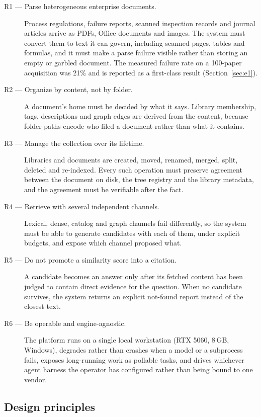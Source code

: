 \begin{description}
\item[R1 --- Parse heterogeneous enterprise documents.] Process regulations,
failure reports, scanned inspection records and journal articles arrive as
PDFs, Office documents and images. The system must convert them to text it
can govern, including scanned pages, tables and formulas, and it must make a
parse failure visible rather than storing an empty or garbled document. The
measured failure rate on a 100-paper acquisition was 21\% and is reported as
a first-class result (Section~\ref{sec:e1}).
\item[R2 --- Organize by content, not by folder.] A document's home must be
decided by what it says. Library membership, tags, descriptions and graph
edges are derived from the content, because folder paths encode who filed a
document rather than what it contains.
\item[R3 --- Manage the collection over its lifetime.] Libraries and
documents are created, moved, renamed, merged, split, deleted and re-indexed.
Every such operation must preserve agreement between the document on disk,
the tree registry and the library metadata, and the agreement must be
verifiable after the fact.
\item[R4 --- Retrieve with several independent channels.] Lexical, dense,
catalog and graph channels fail differently, so the system must be able to
generate candidates with each of them, under explicit budgets, and expose
which channel proposed what.
\item[R5 --- Do not promote a similarity score into a citation.] A candidate
becomes an answer only after its fetched content has been judged to contain
direct evidence for the question. When no candidate survives, the system
returns an explicit not-found report instead of the closest text.
\item[R6 --- Be operable and engine-agnostic.] The platform runs on a single
local workstation (RTX 5060, 8\,GB, Windows), degrades rather than crashes
when a model or a subprocess fails, exposes long-running work as pollable
tasks, and drives whichever agent harness the operator has configured rather
than being bound to one vendor.
\end{description}

\subsection{Design principles}
\label{sec:principles}


